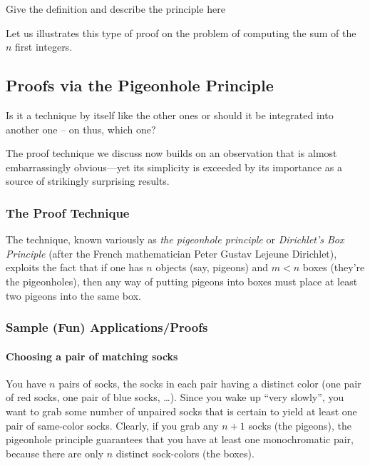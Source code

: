 Give the definition and describe the principle here

Let us illustrates this type of proof on the problem of computing the sum of the $n$ first integers.




\subsection{Proofs via the Pigeonhole Principle}
\label{sec:pigeonhole}

{\Denis Is it a technique by itself like the other ones or should it be integrated into another one -- on thus, which one?}

The proof technique we discuss now builds on an observation that is
almost embarrassingly obvious---yet its simplicity is exceeded by its
importance as a source of strikingly surprising results.

\subsubsection{The Proof Technique}

The technique, known variously as {\it the pigeonhole principle}
or {\it Dirichlet's Box Principle}
(after the French mathematician Peter Gustav Lejeune Dirichlet),
exploits the fact that if one has $n$ objects (say, pigeons) and $m <
n$ boxes (they're the pigeonholes), then any way of putting pigeons
into boxes must place at least two pigeons into the same box.


\subsubsection{Sample (Fun) Applications/Proofs}
\label{sec:pigeon-apps}


\paragraph{\small\sf Choosing a pair of matching socks} 

You have $n$ pairs of socks, the socks in each pair having a distinct
color (one pair of red socks, one pair of blue socks, \ldots).  Since
you wake up ``very slowly'', you want to grab some number of unpaired
socks that is certain to yield at least one pair of same-color socks.
Clearly, if you grab any $n+1$ socks (the pigeons), the pigeonhole
principle guarantees that you have at least one monochromatic pair,
because there are only $n$ distinct sock-colors (the boxes).


